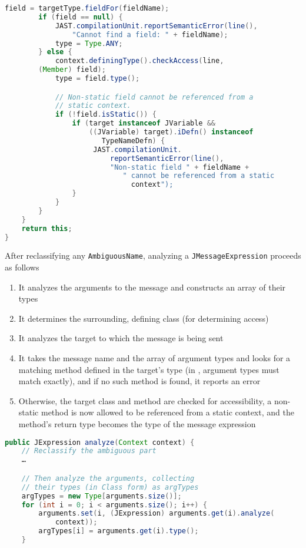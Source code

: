 \documentclass[8pt,a4paper,compress]{beamer}
\begin{document}
\begin{frame}[fragile]
\pause

\begin{lstlisting}[language=Java]
        field = targetType.fieldFor(fieldName);
        if (field == null) {
            JAST.compilationUnit.reportSemanticError(line(),
                "Cannot find a field: " + fieldName);
            type = Type.ANY;
        } else {
            context.definingType().checkAccess(line,
		(Member) field);
            type = field.type();

            // Non-static field cannot be referenced from a
            // static context.
            if (!field.isStatic()) {
                if (target instanceof JVariable &&
                    ((JVariable) target).iDefn() instanceof
                       TypeNameDefn) {
                     JAST.compilationUnit.
                         reportSemanticError(line(),
                         "Non-static field " + fieldName +
                            " cannot be referenced from a static
                              context");
                }
            }
        }
    }
    return this;
}
\end{lstlisting}
\end{frame}

\begin{frame}[fragile]
\pause

After reclassifying any \lstinline{AmbiguousName}, analyzing a \lstinline{JMessageExpression} proceeds as follows

\begin{enumerate}
\item It analyzes the arguments to the message and constructs an array of their types
\item It determines the surrounding, defining class (for determining access)
\item It analyzes the target to which the message is being sent
\item It takes the message name and the array of argument types and looks for a matching method defined in the target's type (in \jmm, argument types must match exactly), and if no such method is found, it reports an error
\item Otherwise, the target class and method are checked for accessibility, a non-static method is now allowed to be referenced from a static context, and the method's return type becomes the type of the message expression
\end{enumerate}

\begin{lstlisting}[language=Java]
public JExpression analyze(Context context) {
    // Reclassify the ambiguous part
    …

    // Then analyze the arguments, collecting
    // their types (in Class form) as argTypes
    argTypes = new Type[arguments.size()];
    for (int i = 0; i < arguments.size(); i++) {
        arguments.set(i, (JExpression) arguments.get(i).analyze(
            context));
        argTypes[i] = arguments.get(i).type();
    }
\end{lstlisting}
\end{frame}
\end{document}
